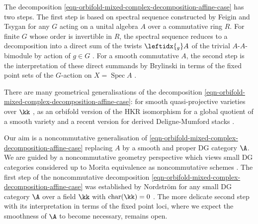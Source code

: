 \documentclass[12pt,a4paper,reqno]{amsart}
\DeclareMathOperator{\chr}{char}
\DeclareMathOperator{\spec}{Spec}
\begin{document}
The decomposition \eqref{eqn-orbifold-mixed-complex-decomposition-affine-case}
has two steps. The first step is
based on spectral sequence constructed by Feigin and Tsygan 
\cite{FeiginTsygan-CyclicHomologyOfAlgebrasWithQuadraticRelationsUniversalEnvelopingAlgebrasAndGroupAlgebras}
for any $G$ acting on a unital algebra $A$ over a commutative ring $R$.
For finite $G$ whose order is invertible in $R$, 
the spectral sequence reduces to a decomposition into a direct sum of
the twists $\leftidx{_g}A$ of the trivial $A\text{-}A$-bimodule by action 
of $g \in G$
\cite[\S4]{GetzlerJones-TheCyclicHomologyOfCrossedProductAlgebras}.
For a smooth commutative $A$, the second step is the interpretation of
these direct summands by Brylinski in terms of the fixed point sets
of the $G$-action on $X = \spec A$ \cite{Brylinski-CyclicHomologyAndEquivariantTheories}.

There are many geometrical generalisations of the decomposition 
\eqref{eqn-orbifold-mixed-complex-decomposition-affine-case}:
for smooth quasi-projective varieties over $\kk$ 
\cite{Baranovsky-OrbifoldCohomologyAsPeriodicCyclicHomology},  
as an orbifold version of the HKR isomorphism for a global quotient of a smooth variety \cite{ArinkinCaldararuHablicsek-FormalityOfDerivedIntersectionsAndTheOrbifoldHKRIsomorphism}
and a recent version for derived Deligne-Mumford stacks 
\cite{FuPortaSibillaScherotzke-HKRIsomorphismForDerivedDM}.

Our aim is a noncommutative generalisation of 
\eqref{eqn-orbifold-mixed-complex-decomposition-affine-case} 
replacing $A$ by a smooth and proper DG category $\A$. We are guided 
by a noncommutative geometry perspective 
which views small DG categories considered up to Morita equivalence 
as noncommutative schemes
\cite{KontsevichSoibelman-NotesOnAInftyAlgebrasAInftyCategoriesAndNoncommutativeGeometry,KatzarkovKontsevichPantev-HodgeTheoreticAspectsOfMirrorSymmetry, 
Kaledin-HomologicalMethodsInNoncommutativeGeometry, 
Orlov-SmoothAndProperNoncommutativeSchemesAndGluingofDGcategories,
Efimov-HomotopyFinitenessOfSomeDGCategoriesFromAlgebraicGeometry}. 
The first step of the noncommutative decomposition 
\eqref{eqn-orbifold-mixed-complex-decomposition-affine-case}
was established by Nordstr\"om for any small DG category $\A$ over  
a field $\kk$ with $\chr(\kk) = 0$
\cite{Nordstrom-FiniteGroupActionsOnDGCategoriesAndHochschildHomology}. 
The more delicate second step with its interpretation in 
terms of the fixed point loci, where we expect the smoothness
of $\A$ to become necessary, remains open. 
\end{document}
